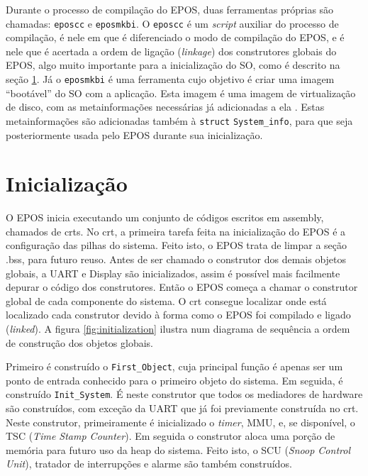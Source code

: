 Durante o processo de compilação do EPOS, duas ferramentas próprias são chamadas: \verb=eposcc= e \verb=eposmkbi=. O \verb=eposcc= é um \emph{script} auxiliar do processo de compilação, é nele em que é diferenciado o modo de compilação do EPOS, e é nele que é acertada a ordem de ligação (\emph{linkage}) dos construtores globais do EPOS, algo muito importante para a inicialização do SO, como é descrito na seção \ref{sec:inicializacao}.
Já o \verb=eposmkbi= é uma ferramenta cujo objetivo é criar uma imagem ``bootável'' do SO com a aplicação. Esta imagem é uma imagem de virtualização de disco, com as metainformações necessárias já adicionadas a ela \cite{tarcisio}. Estas metainformações são adicionadas também à \verb=struct= \verb+System_info+, para que seja posteriormente usada pelo EPOS durante sua inicialização.



\section{Inicialização}
\label{sec:inicializacao}
O EPOS inicia executando um conjunto de códigos escritos em assembly, chamados de crts.
No crt, a primeira tarefa feita na inicialização do EPOS é a configuração das pilhas do sistema. Feito isto, o EPOS trata de limpar a seção .bss, para futuro reuso.
Antes de ser chamado o construtor dos demais objetos globais, a UART e Display são inicializados, assim é possível mais facilmente depurar o código dos construtores.
Então o EPOS começa a chamar o construtor global de cada componente do sistema. O crt consegue localizar onde está localizado cada construtor devido à forma como o EPOS foi compilado e ligado (\emph{linked}). A figura \ref{fig:initialization} ilustra num diagrama de sequência a ordem de construção dos objetos globais.


Primeiro é construído o \verb+First_Object+, cuja principal função é apenas ser um ponto de entrada conhecido para o primeiro objeto do sistema.
Em seguida, é construído \verb+Init_System+. É neste construtor que todos os mediadores de hardware são construídos, com exceção da UART que já foi previamente construída no crt. Neste construtor, primeiramente é inicializado o \emph{timer}, MMU, e, se disponível, o TSC (\emph{Time Stamp Counter}). Em seguida o construtor aloca uma porção de memória para futuro uso da heap do sistema. Feito isto, o SCU (\emph{Snoop Control Unit}), tratador de interrupções e alarme são também construídos.

